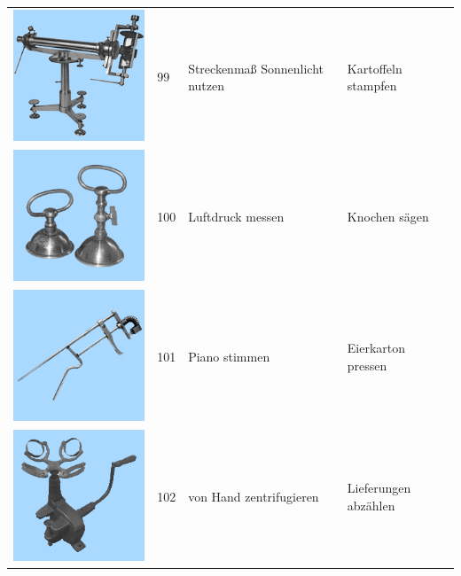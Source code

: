 \documentclass[
  english,
  man,floatsintext]{apa7}
\begin{document}
\begin{center}
\begin{ThreePartTable}
\begin{longtable}{llll}
\includegraphics[valign=c, scale=0.19]{../materials/unfamiliar/99.png} & 99 & Streckenmaß Sonnenlicht nutzen & Kartoffeln stampfen\\
\includegraphics[valign=c, scale=0.19]{../materials/unfamiliar/100.png} & 100 & Luftdruck messen & Knochen sägen\\
\includegraphics[valign=c, scale=0.19]{../materials/unfamiliar/101.png} & 101 & Piano stimmen & Eierkarton pressen\\
\includegraphics[valign=c, scale=0.19]{../materials/unfamiliar/102.png} & 102 & von Hand zentrifugieren & Lieferungen abzählen\\

\end{longtable}
\end{ThreePartTable}
\end{center}
\end{document}
